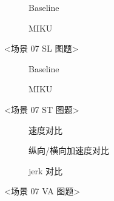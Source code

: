\begin{figure}[H]
\centering
\begin{subfigure}[b]{\textwidth}
  \centering
  
  \caption{Baseline}
  \label{fig:exp_07_narrow_cones_cmp_sl:a}
\end{subfigure}

\begin{subfigure}[b]{\textwidth}
  \centering
  
  \caption{MIKU}
  \label{fig:exp_07_narrow_cones_cmp_sl:b}
\end{subfigure}
\caption{<场景 07 SL 图题>}
\label{fig:exp_07_narrow_cones_cmp_sl}
\end{figure}

\begin{figure}[H]
\centering
\begin{subfigure}[b]{0.48\textwidth}
  \centering
  
  \caption{Baseline}
  \label{fig:exp_07_narrow_cones_cmp_st:a}
\end{subfigure}\hfill
\begin{subfigure}[b]{0.48\textwidth}
  \centering
  
  \caption{MIKU}
  \label{fig:exp_07_narrow_cones_cmp_st:b}
\end{subfigure}
\caption{<场景 07 ST 图题>}
\label{fig:exp_07_narrow_cones_cmp_st}
\end{figure}

\begin{figure}[H]
\centering
\begin{subfigure}[b]{\textwidth}
  \centering
  
  \caption{速度对比}
  \label{fig:exp_07_narrow_cones_cmp_va:a}
\end{subfigure}

\begin{subfigure}[b]{\textwidth}
  \centering
  
  \caption{纵向/横向加速度对比}
  \label{fig:exp_07_narrow_cones_cmp_va:b}
\end{subfigure}

\begin{subfigure}[b]{\textwidth}
  \centering
  
  \caption{jerk 对比}
  \label{fig:exp_07_narrow_cones_cmp_va:c}
\end{subfigure}
\caption{<场景 07 VA 图题>}
\label{fig:exp_07_narrow_cones_cmp_va}
\end{figure}


